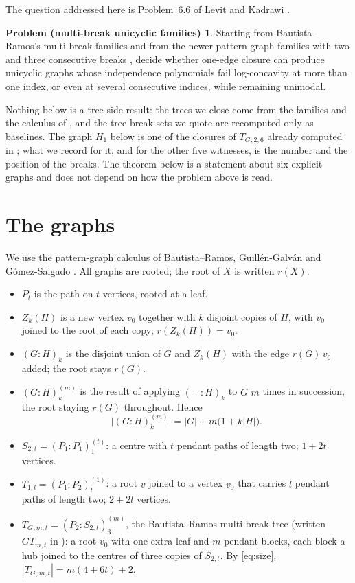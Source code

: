 \documentclass[11pt]{amsart}
\theoremstyle{definition}
\newtheorem*{problemLK}{Problem (multi-break unicyclic families)}
\theoremstyle{remark}
\newcommand{\TG}{T_{G}}
\begin{document}
The question addressed here is Problem~6.6 of Levit and Kadrawi
\cite{LevitKadrawi}.

\begin{problemLK}
Starting from Bautista--Ramos's multi-break families
\textup{\cite{BautistaRamos}} and from the newer pattern-graph families with two and
three consecutive breaks \textup{\cite{BRGG}}, decide whether one-edge closure can
produce unicyclic graphs whose independence polynomials fail log-concavity at more
than one index, or even at several consecutive indices, while remaining unimodal.
\end{problemLK}

Nothing below is a tree-side result: the trees we close come from the families and the
calculus of \cite{BautistaRamos,BRGG}, and the tree break sets we quote are recomputed
only as baselines. The graph $H_1$ below is one of the closures of $\TG{}_{,2,6}$
already computed in \cite{LevitKadrawi}; what we record for it, and for the other five
witnesses, is the number and the position of the breaks. The theorem below is a
statement about six explicit graphs and does not depend on how the problem above is
read.

\section{The graphs}

We use the pattern-graph calculus of Bautista--Ramos, Guill\'en-Galv\'an and
G\'omez-Salgado \cite{BRGG}. All graphs are rooted; the
root of $X$ is written $r(X)$.

\begin{itemize}
\item $P_t$ is the path on $t$ vertices, rooted at a leaf.
\item $Z_k(H)$ is a new vertex $v_0$ together with $k$ disjoint copies of $H$, with
      $v_0$ joined to the root of each copy; $r(Z_k(H))=v_0$.
\item $(G:H)_k$ is the disjoint union of $G$ and $Z_k(H)$ with the edge
      $r(G)\,v_0$ added; the root stays $r(G)$.
\item $(G:H)_k^{(m)}$ is the result of applying $(\,\cdot\,:H)_k$ to $G$ $m$ times in
      succession, the root staying $r(G)$ throughout. Hence
      \begin{equation}\label{eq:size}
        \bigl|(G:H)_k^{(m)}\bigr|=|G|+m\bigl(1+k|H|\bigr).
      \end{equation}
\item $S_{2,t}=(P_1:P_1)_1^{(t)}$: a centre with $t$ pendant paths of length two;
      $1+2t$ vertices.
\item $T_{1,l}=(P_1:P_2)_l^{(1)}$: a root $v$ joined to a vertex $v_0$ that carries
      $l$ pendant paths of length two; $2+2l$ vertices.
\item $\TG{}_{,m,t}=(P_2:S_{2,t})_3^{(m)}$, the Bautista--Ramos multi-break tree
      (written $GT_{m,t}$ in \cite{BautistaRamos,BRGG}): a root $v_0$ with one extra
      leaf and $m$ pendant blocks, each block a hub joined to the centres of three
      copies of $S_{2,t}$. By \eqref{eq:size}, $|\TG{}_{,m,t}|=m(4+6t)+2$.
\end{itemize}
\end{document}
